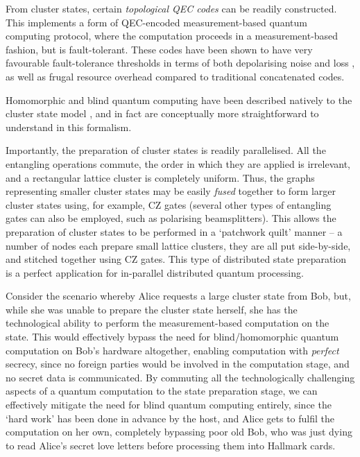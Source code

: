 \documentclass[aps,rmp,twocolumn,amsmath,amssymb,nofootinbib,superscriptaddress]{revtex4}
\newcommand{\comment}[1]{{\color{blue}{\textbf{#1}}}}
\begin{document}
From cluster states, certain \emph{topological QEC codes} \cite{???} can be readily constructed. This implements a form of QEC-encoded measurement-based quantum computing protocol, where the computation proceeds in a measurement-based fashion, but is fault-tolerant. These codes have been shown to have very favourable fault-tolerance thresholds in terms of both depolarising noise and loss \cite{bib:StaceBarrettDohertyLoss, bib:BarrettStaceFT}, as well as frugal resource overhead compared to traditional concatenated codes.

Homomorphic and blind quantum computing have been described natively to the cluster state model \cite{homoCS}, and in fact are conceptually more straightforward to understand in this formalism. \comment{Explain these protocols}

Importantly, the preparation of cluster states is readily parallelised. All the entangling operations commute, the order in which they are applied is irrelevant, and a rectangular lattice cluster is completely uniform. Thus, the graphs representing smaller cluster states may be easily \emph{fused} together to form larger cluster states using, for example, CZ gates (several other types of entangling gates can also be employed, such as polarising beamsplitters). This allows the preparation of cluster states to be performed in a `patchwork quilt' manner -- a number of nodes each prepare small lattice clusters, they are all put side-by-side, and stitched together using CZ gates. This type of distributed state preparation is a perfect application for in-parallel distributed quantum processing.

Consider the scenario whereby Alice requests a large cluster state from Bob, but, while she was unable to prepare the cluster state herself, she has the technological ability to perform the measurement-based computation on the state. This would effectively bypass the need for blind/homomorphic quantum computation on Bob's hardware altogether, enabling computation with \emph{perfect} secrecy, since no foreign parties would be involved in the computation stage, and no secret data is communicated. By commuting all the technologically challenging aspects of a quantum computation to the state preparation stage, we can effectively mitigate the need for blind quantum computing entirely, since the `hard work' has been done in advance by the host, and Alice gets to fulfil the computation on her own, completely bypassing poor old Bob, who was just dying to read Alice's secret love letters before processing them into Hallmark cards.
\end{document}
